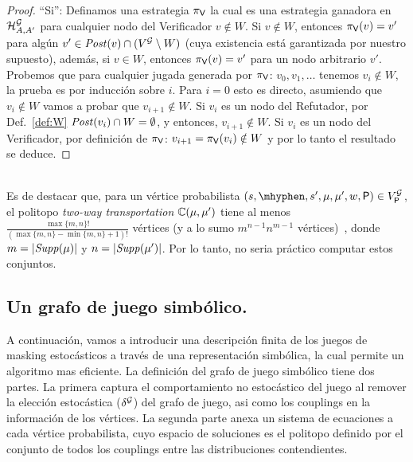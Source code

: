 \begin{proof}
``Si'':  Definamos una estrategia $\pi_{\mathsf{V}}$ la cual es una estrategia ganadora en $\mathcal{H}^{\mathcal{G}}_{A,A'}$ para cualquier nodo del Verificador $v \notin W$. 
Si $v \notin W$, entonces $\pi_{\mathsf{V}}(v) = v'$ para algún $v' \in \mathit{Post}(v) \cap (V^{\mathcal{G}} \setminus W)$ (cuya existencia está garantizada por nuestro supuesto), 
además, si $v \in W$, entonces $\pi_{\mathsf{V}}(v) = v'$ para un nodo arbitrario $v'$. 
Probemos que para cualquier jugada generada por $\pi_{\mathsf{V}}$: $v_0, v_1, \dots$ tenemos $v_i \notin W$, la prueba es por inducción sobre $i$.
Para $i=0$ esto es directo, asumiendo que $v_i \notin W$ vamos a probar que $v_{i+1} \notin W$. 
Si $v_i$ es un nodo del Refutador, por Def.~\ref{def:W}  
$\mathit{Post}(v_i) \cap W = \emptyset$, y entonces, $v_{i+1} \notin W$. 
Si $v_i$ es un nodo del Verificador, por definición de $\pi_{\mathsf{V}}$: $v_{i+1} = \pi_{\mathsf{V}}(v_i) \notin W$ y por lo tanto el resultado se deduce.  
\end{proof} \\


%
Es de destacar que, para un vértice probabilista
$(s, \mhyphen, s', \mu, \mu', w, \Probabilistic) \in V^\StochG_\Probabilistic$,
el politopo \textit{two-way transportation} $\mathbb{C}(\mu,\mu')$ tiene al menos $\frac{\max\{m,n\}!}{(\max\{m, n\}-\min\{m,n\}+1)!}$ vértices
(y a lo sumo $m^{n-1}n^{m-1}$ vértices)~\cite{KleeWitzgall}, donde
$m=|\mathit{Supp}(\mu)|$ y $n=|\mathit{Supp}(\mu')|$.  Por lo tanto, no seria práctico computar estos conjuntos.





\subsection{Un grafo de juego simbólico.}


A continuación, vamos a introducir una descripción finita de los juegos de masking estocásticos a través de una representación simbólica, la cual permite un algoritmo mas eficiente.
%
La definición del grafo de juego simbólico tiene dos partes.  La primera captura el comportamiento no estocástico del juego al remover la elección estocástica ($\delta^{\mathcal{G}}$) del grafo de juego, asi como los couplings en la información de los vértices. La segunda parte anexa un sistema de ecuaciones a cada vértice probabilista, cuyo espacio de soluciones es el politopo definido por el conjunto de todos los couplings entre las distribuciones contendientes.



